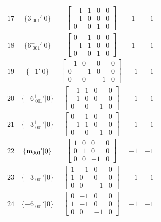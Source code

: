 \documentclass[fleqn,8pt]{jsarticle}
\begin{document}
\begin{longtable}{ccccc}
$ 17 $ & $ \{3^{-}_{\,\,001}{}'|0\} $ & $ \begin{bmatrix} -1 & 1 & 0 & 0 \\ -1 & 0 & 0 & 0 \\ 0 & 0 & 1 & 0 \end{bmatrix} $ & $ 1 $ & $ -1 $ \\ \hline
$ 18 $ & $ \{6^{-}_{\,\,001}{}'|0\} $ & $ \begin{bmatrix} 0 & 1 & 0 & 0 \\ -1 & 1 & 0 & 0 \\ 0 & 0 & 1 & 0 \end{bmatrix} $ & $ 1 $ & $ -1 $ \\ \hline
$ 19 $ & $ \{-1{}'|0\} $ & $ \begin{bmatrix} -1 & 0 & 0 & 0 \\ 0 & -1 & 0 & 0 \\ 0 & 0 & -1 & 0 \end{bmatrix} $ & $ -1 $ & $ -1 $ \\ \hline
$ 20 $ & $ \{-6^{+}_{\,\,001}{}'|0\} $ & $ \begin{bmatrix} -1 & 1 & 0 & 0 \\ -1 & 0 & 0 & 0 \\ 0 & 0 & -1 & 0 \end{bmatrix} $ & $ -1 $ & $ -1 $ \\ \hline
$ 21 $ & $ \{-3^{+}_{\,\,001}{}'|0\} $ & $ \begin{bmatrix} 0 & 1 & 0 & 0 \\ -1 & 1 & 0 & 0 \\ 0 & 0 & -1 & 0 \end{bmatrix} $ & $ -1 $ & $ -1 $ \\ \hline
$ 22 $ & $ \{{\rm m}_{001}{}'|0\} $ & $ \begin{bmatrix} 1 & 0 & 0 & 0 \\ 0 & 1 & 0 & 0 \\ 0 & 0 & -1 & 0 \end{bmatrix} $ & $ -1 $ & $ -1 $ \\ \hline
$ 23 $ & $ \{-3^{-}_{\,\,001}{}'|0\} $ & $ \begin{bmatrix} 1 & -1 & 0 & 0 \\ 1 & 0 & 0 & 0 \\ 0 & 0 & -1 & 0 \end{bmatrix} $ & $ -1 $ & $ -1 $ \\ \hline
$ 24 $ & $ \{-6^{-}_{\,\,001}{}'|0\} $ & $ \begin{bmatrix} 0 & -1 & 0 & 0 \\ 1 & -1 & 0 & 0 \\ 0 & 0 & -1 & 0 \end{bmatrix} $ & $ -1 $ & $ -1 $ \\
\end{longtable}
\end{document}
